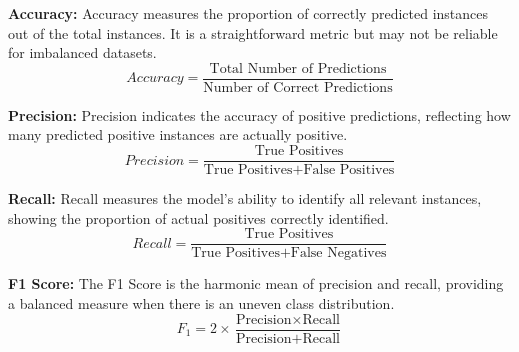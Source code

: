 \textbf{Accuracy:} Accuracy measures the proportion of correctly predicted instances out of the total instances. It is a straightforward metric but may not be reliable for imbalanced datasets.
\begin{equation}
    Accuracy = \frac{\text{Total Number of Predictions}}{\text{Number of Correct Predictions}}
\end{equation}

\textbf{Precision:} Precision indicates the accuracy of positive predictions, reflecting how many predicted positive instances are actually positive.
\begin{equation}
    Precision = \frac{\text{True Positives}}{\text{True Positives} + \text{False Positives}}
\end{equation}

\textbf{Recall:} Recall measures the model’s ability to identify all relevant instances, showing the proportion of actual positives correctly identified.
\begin{equation}
    Recall = \frac{\text{True Positives}}{\text{True Positives} + \text{False Negatives}}
\end{equation}

\textbf{F1 Score:} The F1 Score is the harmonic mean of precision and recall, providing a balanced measure when there is an uneven class distribution.
\begin{equation}
    F_1 = 2 \times \frac{\text{Precision} \times \text{Recall}}{\text{Precision} + \text{Recall}}
\end{equation}